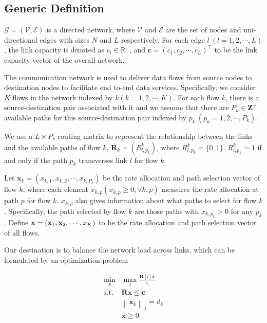 \subsection{Generic Definition}
\label{sec:definition}
$\mathcal{G}=(\mathcal{V},\mathcal{E})$ is a directed network, where $\mathcal{V}$ and $\mathcal{E}$ are the set of nodes and uni-directional edges with sizes $N$ and $L$ respectively. For each edge $l\ (l=1,2,\cdots,L)$, the link capacity is denoted as $c_l \in \mathbb{R}^{+}$, and $\mathbf{c}=(c_1,c_2,\cdots,c_L)^\top$ to be the link capacity vector of the overall network. 

The communication network is
used to deliver data flows from source nodes to destination nodes to facilitate end to-end data services. Specifically, we consider $K$ flows in the network indexed by $k
(k = 1,2,\cdots,K)$. For each flow $k$, there is a source-destination pair associated with
it and we assume that there are $P_k\in \mathbf{Z}^{+}$ available paths for this source-destination pair indexed by $p_k\ (p_k=1,2,\cdots,P_k)$. 

We use a $L\times P_k$ routing matrix to represent the relationship between the links and the available paths of flow $k$, $\mathbf{R}_k=(R^k_{l,p_k})$, where $R^k_{l,p_k}=\{0,1\}$. $R^k_{l,p_k}=1$ if and only if the path $p_k$ transverses link $l$ for flow $k$.

Let $\mathbf{x}_k = (x_{k,1}, x_{k,2},\cdots, x_{k,P_k})$  be the rate allocation and path selection vector of flow $k$, where each element $x_{k,p} (x_{k,p}\geq  0, \forall k, p)$ measures the rate allocation at
path $p$ for flow $k$. $x_{k,p}$ also gives information about what paths to select for flow $k$. Specifically, the path selected by flow $k$ are those paths with $x_{k,p_k} > 0$ for any $p_k$. Define $\mathbf{x} = (\mathbf{x}_1, \mathbf{x}_2,\cdots, x_K)$ to be the rate allocation and path selection vector of all flows.

Our destination is to balance the network load across links, which can be formulated by an optimization problem

\begin{equation}
\label{eq:origin}
\begin{array}{cl}
\min _{\mathbf{x}} & \max _{l} \frac{\mathbf{R}[l] \mathbf{x}}{c_{l}} \\
\text {s.t.} & \mathbf{R x} \leq \mathbf{c} \\
& \left\|\mathbf{x}_{k}\right\|_{1}=d_{k} \\
& \mathbf{x} \geq 0
\end{array}\end{equation}


